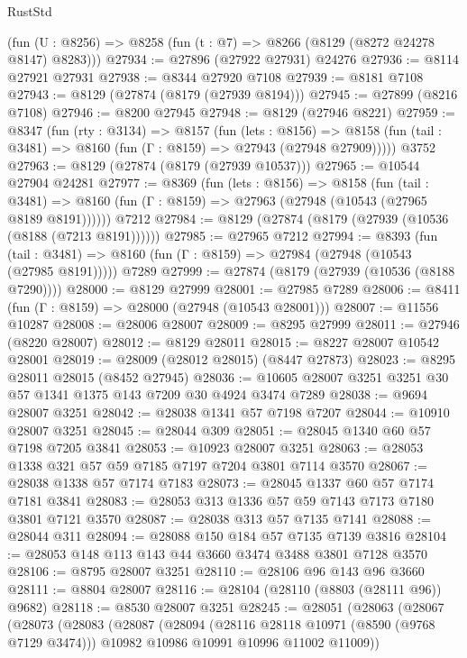 \begin{lexlean}{RustStd}
\begin{coremodule}
    (fun (U : @8256) => @8258 (fun (t : @7) => @8266 (@8129 (@8272 @24278 @8147) @8283)))
@27934 := @27896 (@27922 @27931) @24276
@27936 := @8114 @27921 @27931
@27938 := @8344 @27920 @7108
@27939 := @8181 @7108
@27943 := @8129 (@27874 (@8179 (@27939 @8194)))
@27945 := @27899 (@8216 @7108)
@27946 := @8200 @27945
@27948 := @8129 (@27946 @8221)
@27959 := @8347
    (fun (rty : @3134) =>
    @8157
      (fun (lets : @8156) =>
      @8158 (fun (tail : @3481) => @8160 (fun (Γ : @8159) => @27943 (@27948 @27909)))))
    @3752
@27963 := @8129 (@27874 (@8179 (@27939 @10537)))
@27965 := @10544 @27904 @24281
@27977 := @8369
    (fun (lets : @8156) =>
    @8158
      (fun (tail : @3481) =>
      @8160 (fun (Γ : @8159) => @27963 (@27948 (@10543 (@27965 @8189 @8191))))))
    @7212
@27984 := @8129 (@27874 (@8179 (@27939 (@10536 (@8188 (@7213 @8191))))))
@27985 := @27965 @7212
@27994 := @8393
    (fun (tail : @3481) => @8160 (fun (Γ : @8159) => @27984 (@27948 (@10543 (@27985 @8191)))))
    @7289
@27999 := @27874 (@8179 (@27939 (@10536 (@8188 @7290))))
@28000 := @8129 @27999
@28001 := @27985 @7289
@28006 := @8411 (fun (Γ : @8159) => @28000 (@27948 (@10543 @28001)))
@28007 := @11556 @10287
@28008 := @28006 @28007
@28009 := @8295 @27999
@28011 := @27946 (@8220 @28007)
@28012 := @8129 @28011
@28015 := @8227 @28007 @10542 @28001
@28019 := @28009 (@28012 @28015) (@8447 @27873)
@28023 := @8295 @28011 @28015 (@8452 @27945)
@28036 := @10605 @28007 @3251 @3251 @30 @57 @1341 @1375 @143 @7209 @30 @4924 @3474 @7289
@28038 := @9694 @28007 @3251
@28042 := @28038 @1341 @57 @7198 @7207
@28044 := @10910 @28007 @3251
@28045 := @28044 @309
@28051 := @28045 @1340 @60 @57 @7198 @7205 @3841
@28053 := @10923 @28007 @3251
@28063 := @28053 @1338 @321 @57 @59 @7185 @7197 @7204 @3801 @7114 @3570
@28067 := @28038 @1338 @57 @7174 @7183
@28073 := @28045 @1337 @60 @57 @7174 @7181 @3841
@28083 := @28053 @313 @1336 @57 @59 @7143 @7173 @7180 @3801 @7121 @3570
@28087 := @28038 @313 @57 @7135 @7141
@28088 := @28044 @311
@28094 := @28088 @150 @184 @57 @7135 @7139 @3816
@28104 := @28053 @148 @113 @143 @44 @3660 @3474 @3488 @3801 @7128 @3570
@28106 := @8795 @28007 @3251
@28110 := @28106 @96 @143 @96 @3660
@28111 := @8804 @28007
@28116 := @28104 (@28110 (@8803 (@28111 @96)) @9682)
@28118 := @8530 @28007 @3251
@28245 := @28051
    (@28063
      (@28067
        (@28073
          (@28083
            (@28087
              (@28094
                (@28116 @28118 @10971 (@8590 (@9768 @7129 @3474)))
                @10982
                @10986
                @10991
                @10996
                @11002
                @11009))

\end{coremodule}
\end{lexlean}
